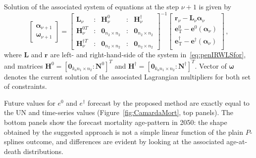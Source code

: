 \documentclass[a4paper,twoside, openright, 12pt, leqno]{article}
\begin{document}
Solution of the associated system of equations at the step $\nu + 1$ is given by
\begin{equation}\label{eq:SQLalg}
\left[ \begin{array}{l}
\bm{\alpha}_{\nu+1}\\
\bm{\omega}_{\nu+1}
\end{array}\right] = 
\left[ \begin{array}{lllll}
\bm{L}_{\nu}  &:& \bm{H}^{0}_{\nu} &:& \bm{H}^{\dagger}_{\nu}\\
\bm{H}_{\nu}^{0 T}  &:& \bm{0}_{n_{2} \times n_{2}}&:&\bm{0}_{n_{2} \times n_{2}}\\
\bm{H}_{\nu}^{\dagger T} &:& \bm{0}_{n_{2} \times n_{2}} &:& \bm{0}_{n_{2} \times n_{2}}
\end{array}\right]^{-1}
\left[ \begin{array}{c}
\bm{r}_{\nu} - \bm{L}_{\nu}\bm{\alpha}_{\nu}\\
\bm{e}^{0}_{\mathrm{T}} - \bm{e}^{0} (\bm{\alpha}_{\nu})\\
\bm{e}^{\dagger}_{\mathrm{T}} - \bm{e}^{\dagger} (\bm{\alpha}_{\nu})\\
\end{array}\right] \, ,
\end{equation}
where $\bm{L}$ and $\bm{r}$ are left- and right-hand-side of the system in~\eqref{eq:penIRWLSfor}, and matrices $\bm{H}^{0} = \left[\bm{0}_{k_{a}n_{1}\times n_{2}}:\bm{N}^{0} \right]^{T}$ and $\bm{H}^{\dagger} = \left[\bm{0}_{k_{a}n_{1}\times n_{2}}:\bm{N}^{\dagger} \right]^{T}$. Vector of $\bm{\omega}$ denotes the current solution of the associated Lagrangian multipliers for both set of constraints.

Future values for $e^{0}$ and $e^{\dagger}$ forecast by the proposed method are exactly equal to the UN and time-series values (Figure~\ref{fig:CamardaMort}, top panels). The bottom panels show the forecast mortality age-pattern in 2050: the shape obtained by the suggested approach is not a simple linear function of the plain $P$-splines outcome, and differences are evident by looking at the associated age-at-death distributions. 
\end{document}
